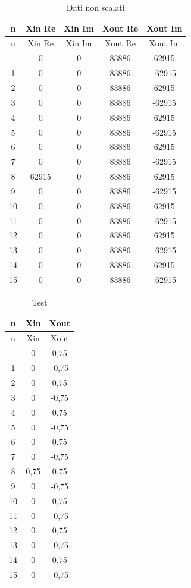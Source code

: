 \documentclass[a4paper, titlepage]{article}
\begin{document}
\begin{longtable}{*5c}
\caption{Dati non scalati}
\label{}\\
\toprule
n & Xin Re & Xin Im & Xout Re & Xout Im \\
\midrule
\endfirsthead
n & Xin Re & Xin Im & Xout Re & Xout Im \\
\midrule
\endhead
\midrule
\endfoot
\bottomrule
\endlastfoot
0 & 0 & 0 & 83886 & 62915\\
1 & 0    & 0 & 83886 & -62915 \\
2 & 0    & 0 & 83886 & 62915 \\
3 & 0    & 0 & 83886 & -62915 \\
4 & 0    & 0 & 83886 & 62915 \\
5 & 0    & 0 & 83886 & -62915 \\
6 & 0    & 0 & 83886 & 62915 \\
7 & 0    & 0 & 83886 & -62915 \\
8 & 62915    & 0 & 83886 & 62915 \\
9 & 0    & 0 & 83886 & -62915 \\
10& 0    & 0 & 83886 & 62915 \\
11& 0    & 0 & 83886 & -62915 \\
12& 0    & 0 & 83886 & 62915 \\
13& 0    & 0 & 83886 & -62915 \\
14& 0    & 0 & 83886 & 62915 \\
15 & 0 & 0 & 83886 & -62915 \\ 
\end{longtable}
\newpage
\begin{longtable}{*3c}
\caption{Test}
\label{}\\
\toprule
n & Xin & Xout\\
\midrule
\endfirsthead
n & Xin & Xout\\
\midrule
\endhead
\midrule
\endfoot
\bottomrule
\endlastfoot
0 & 0& 0,75\\
1 & 0& -0,75\\
2 & 0& 0,75\\
3 & 0& -0,75\\
4 & 0& 0,75\\
5 & 0& -0,75\\
6 & 0& 0,75\\
7 & 0& -0,75 \\
8 & 0,75& 0,75 \\
9 & 0& -0,75\\
10& 0& 0,75\\
11& 0& -0,75\\
12& 0& 0,75\\
13& 0& -0,75\\
14& 0& 0,75\\
15& 0& -0,75\\ 
\end{longtable}
\end{document}
